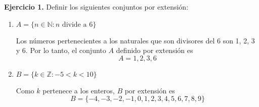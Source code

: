 \textbf{Ejercicio 1.} Definir los siguientes conjuntos por extensión:

\begin{enumerate}
	\item $A = \{n \in \mathbb{N}: n \text{ divide a } 6\}$
	
	Los n\'umeros pertenecientes a los naturales que son divisores del 6 son 1, 2, 3 y 6. Por lo tanto, el conjunto $A$ definido por extensi\'on es $$A = {1, 2, 3, 6}$$
	
	\item $B = \{ k \in \mathbb{Z}: -5 < k < 10 \}$
	
	Como $k$ pertenece a los enteros, $B$ por extensi\'on es $$B = \{ -4, -3, -2, -1, 0, 1, 2, 3, 4, 5, 6, 7, 8, 9 \}$$
\end{enumerate}